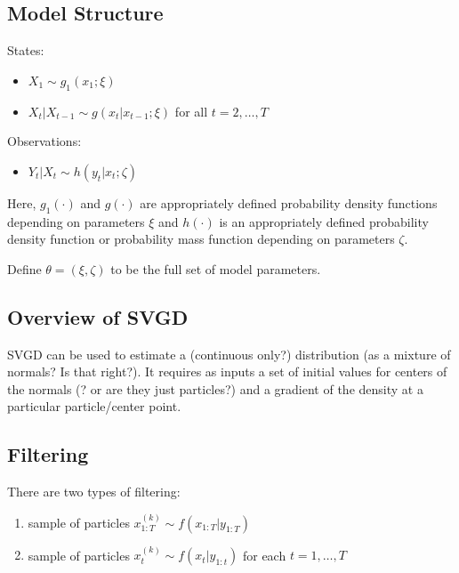 \documentclass[]{article}
\providecommand{\tightlist}{%
  \setlength{\itemsep}{0pt}\setlength{\parskip}{0pt}}
\begin{document}
\subsection{Model Structure}\label{model-structure}

States:

\begin{itemize}
\item $X_1 \sim g_1(x_1 ; \xi)$
\item $X_t \vert X_{t-1} \sim g(x_t \vert x_{t - 1} ; \xi)$ for all $t = 2, \ldots, T$
\end{itemize}

Observations:

\begin{itemize}
\item $Y_t \vert X_{t} \sim h(y_t | x_t ; \zeta)$
\end{itemize}

Here, \(g_1(\cdot)\) and \(g(\cdot)\) are appropriately defined
probability density functions depending on parameters \(\xi\) and
\(h(\cdot)\) is an appropriately defined probability density function or
probability mass function depending on parameters \(\zeta\).

Define \(\theta = (\xi, \zeta)\) to be the full set of model parameters.

\subsection{Overview of SVGD}\label{overview-of-svgd}

SVGD can be used to estimate a (continuous only?) distribution (as a
mixture of normals? Is that right?). It requires as inputs a set of
initial values for centers of the normals (? or are they just
particles?) and a gradient of the density at a particular
particle/center point.

\subsection{Filtering}\label{filtering}

There are two types of filtering:

\begin{enumerate}
\def\labelenumi{\arabic{enumi}.}
\tightlist
\item
  sample of particles \(x_{1:T}^{(k)} \sim f(x_{1:T} | y_{1:T})\)
\item
  sample of particles \(x_{t}^{(k)} \sim f(x_{t} | y_{1:t})\) for each
  \(t = 1, \ldots, T\)
\end{enumerate}
\end{document}
